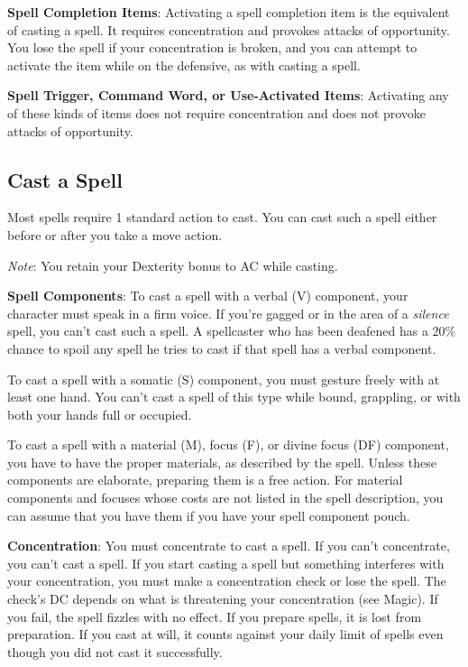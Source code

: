 \textbf{Spell Completion Items}: Activating a spell completion item is the equivalent of casting a spell. It requires concentration and provokes attacks of opportunity. You lose the spell if your concentration is broken, and you can attempt to activate the item while on the defensive, as with casting a spell.
				
\textbf{Spell Trigger, Command Word, or Use-Activated Items}: Activating any of these kinds of items does not require concentration and does not provoke attacks of opportunity.
				
\subsection{Cast a Spell}

				
Most spells require 1 standard action to cast. You can cast such a spell either before or after you take a move action. 
				
\textit{Note}: You retain your Dexterity bonus to AC while casting.
				
\textbf{Spell Components}: To cast a spell with a verbal (V) component, your character must speak in a firm voice. If you're gagged or in the area of a \textit{silence }spell, you can't cast such a spell. A spellcaster who has been deafened has a 20\% chance to spoil any spell he tries to cast if that spell has a verbal component.
				
To cast a spell with a somatic (S) component, you must gesture freely with at least one hand. You can't cast a spell of this type while bound, grappling, or with both your hands full or occupied.
				
To cast a spell with a material (M), focus (F), or divine focus (DF) component, you have to have the proper materials, as described by the spell. Unless these components are elaborate, preparing them is a free action. For material components and focuses whose costs are not listed in the spell description, you can assume that you have them if you have your spell component pouch.
				
\textbf{Concentration}: You must concentrate to cast a spell. If you can't concentrate, you can't cast a spell. If you start casting a spell but something interferes with your concentration, you must make a concentration check or lose the spell. The check's DC depends on what is threatening your concentration (see Magic). If you fail, the spell fizzles with no effect. If you prepare spells, it is lost from preparation. If you cast at will, it counts against your daily limit of spells even though you did not cast it successfully.
				
